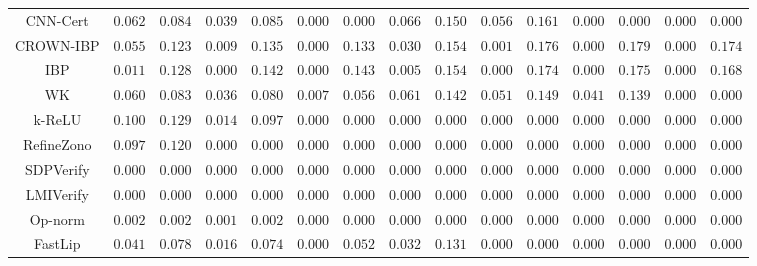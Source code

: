 \begin{table*}
{\begin{tabular}{c|c|c|c|c|c|c|c|c|c|c|c|c|c|c}
     CNN-Cert &       $0.062$ &       $0.084$ &       $0.039$ &       $0.085$ &       $0.000$ &       $0.000$ &       $0.066$ &       $0.150$ &       $0.056$ &       $0.161$ &       $0.000$ &       $0.000$ &       $0.000$ &       $0.000$ \\
    CROWN-IBP &       $0.055$ &       $0.123$ &       $0.009$ &       $0.135$ &       $0.000$ &       $0.133$ &       $0.030$ &       $0.154$ &       $0.001$ &       $0.176$ &       $0.000$ &       $0.179$ &       $0.000$ &       $0.174$ \\
          IBP &       $0.011$ &       $0.128$ &       $0.000$ &       $0.142$ &       $0.000$ &       $0.143$ &       $0.005$ &       $0.154$ &       $0.000$ &       $0.174$ &       $0.000$ &       $0.175$ &       $0.000$ &       $0.168$ \\
           WK &       $0.060$ &       $0.083$ &       $0.036$ &       $0.080$ &       $0.007$ &       $0.056$ &       $0.061$ &       $0.142$ &       $0.051$ &       $0.149$ &       $0.041$ &       $0.139$ &       $0.000$ &       $0.000$ \\
       k-ReLU &       $0.100$ &       $0.129$ &       $0.014$ &       $0.097$ &       $0.000$ &       $0.000$ &       $0.000$ &       $0.000$ &       $0.000$ &       $0.000$ &       $0.000$ &       $0.000$ &       $0.000$ &       $0.000$ \\
   RefineZono &       $0.097$ &       $0.120$ &       $0.000$ &       $0.000$ &       $0.000$ &       $0.000$ &       $0.000$ &       $0.000$ &       $0.000$ &       $0.000$ &       $0.000$ &       $0.000$ &       $0.000$ &       $0.000$ \\
    SDPVerify &       $0.000$ &       $0.000$ &       $0.000$ &       $0.000$ &       $0.000$ &       $0.000$ &       $0.000$ &       $0.000$ &       $0.000$ &       $0.000$ &       $0.000$ &       $0.000$ &       $0.000$ &       $0.000$ \\
    LMIVerify &       $0.000$ &       $0.000$ &       $0.000$ &       $0.000$ &       $0.000$ &       $0.000$ &       $0.000$ &       $0.000$ &       $0.000$ &       $0.000$ &       $0.000$ &       $0.000$ &       $0.000$ &       $0.000$ \\
      Op-norm &       $0.002$ &       $0.002$ &       $0.001$ &       $0.002$ &       $0.000$ &       $0.000$ &       $0.000$ &       $0.000$ &       $0.000$ &       $0.000$ &       $0.000$ &       $0.000$ &       $0.000$ &       $0.000$ \\
      FastLip &       $0.041$ &       $0.078$ &       $0.016$ &       $0.074$ &       $0.000$ &       $0.052$ &       $0.032$ &       $0.131$ &       $0.000$ &       $0.000$ &       $0.000$ &       $0.000$ &       $0.000$ &       $0.000$ \\

\end{tabular}}
\end{table*}
